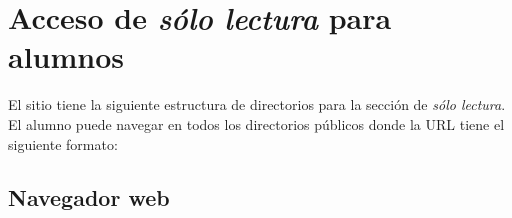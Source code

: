 \newpage

    \section {Acceso de \textsl{s\'{o}lo lectura} para alumnos}
    \label{sec:man-ro}

El sitio tiene la siguiente estructura de directorios para la secci\'{o}n de \textit{s\'{o}lo lectura}. El alumno puede navegar en todos los directorios p\'{u}blicos donde la \textsc{URL} tiene el siguiente formato:

{
 \linespread{1}
 \begin{table}[H]
 \caption{Formato de la \textsc{URL} de la secci\'{o}n de \textit{s\'{o}lo lectura}}{}
 \label{tab:ro-url-format}
 \noindent{} %
 \end{table}
}

      \subsection {Navegador web}
      \label{subsec:man-ro-browser}


